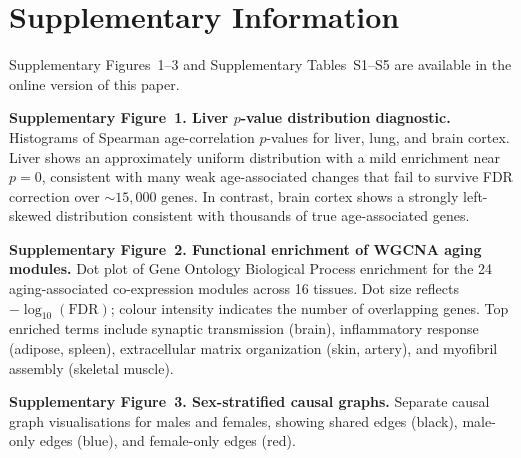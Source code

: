 \documentclass[11pt,a4paper]{article}
\begin{document}

\clearpage
\section*{Supplementary Information}

Supplementary Figures~1--3 and Supplementary Tables~S1--S5 are available in the online version of this paper.

\bigskip

\noindent\textbf{Supplementary Figure~1. Liver $p$-value distribution diagnostic.} Histograms of Spearman age-correlation $p$-values for liver, lung, and brain cortex. Liver shows an approximately uniform distribution with a mild enrichment near $p = 0$, consistent with many weak age-associated changes that fail to survive FDR correction over ${\sim}15{,}000$ genes. In contrast, brain cortex shows a strongly left-skewed distribution consistent with thousands of true age-associated genes.

\bigskip

\noindent\textbf{Supplementary Figure~2. Functional enrichment of WGCNA aging modules.} Dot plot of Gene Ontology Biological Process enrichment for the 24 aging-associated co-expression modules across 16 tissues. Dot size reflects $-\log_{10}(\text{FDR})$; colour intensity indicates the number of overlapping genes. Top enriched terms include synaptic transmission (brain), inflammatory response (adipose, spleen), extracellular matrix organization (skin, artery), and myofibril assembly (skeletal muscle).

\bigskip

\noindent\textbf{Supplementary Figure~3. Sex-stratified causal graphs.} Separate causal graph visualisations for males and females, showing shared edges (black), male-only edges (blue), and female-only edges (red).
\end{document}
